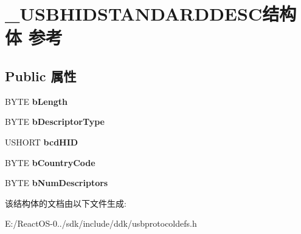 \hypertarget{struct___u_s_b_h_i_d_s_t_a_n_d_a_r_d_d_e_s_c}{}\section{\+\_\+\+U\+S\+B\+H\+I\+D\+S\+T\+A\+N\+D\+A\+R\+D\+D\+E\+S\+C结构体 参考}
\label{struct___u_s_b_h_i_d_s_t_a_n_d_a_r_d_d_e_s_c}
\subsection*{Public 属性}
\begin{DoxyCompactItemize}
\item 
\mbox{\label{struct___u_s_b_h_i_d_s_t_a_n_d_a_r_d_d_e_s_c_ad0d0dddd177ac843a0db0f98d6899f40}} 
B\+Y\+TE {\bfseries b\+Length}
\item 
\mbox{\label{struct___u_s_b_h_i_d_s_t_a_n_d_a_r_d_d_e_s_c_aa65ead3586c3c46619e8575e7a60b907}} 
B\+Y\+TE {\bfseries b\+Descriptor\+Type}
\item 
\mbox{\label{struct___u_s_b_h_i_d_s_t_a_n_d_a_r_d_d_e_s_c_ae37601306c31bb0b5603d6d6944233e5}} 
U\+S\+H\+O\+RT {\bfseries bcd\+H\+ID}
\item 
\mbox{\label{struct___u_s_b_h_i_d_s_t_a_n_d_a_r_d_d_e_s_c_a1cc5bcf533cdf6ed7f1e344644c549f3}} 
B\+Y\+TE {\bfseries b\+Country\+Code}
\item 
\mbox{\label{struct___u_s_b_h_i_d_s_t_a_n_d_a_r_d_d_e_s_c_a1707a9f62c069ae314674920a0d9ce62}} 
B\+Y\+TE {\bfseries b\+Num\+Descriptors}
\end{DoxyCompactItemize}


该结构体的文档由以下文件生成\+:\begin{DoxyCompactItemize}
\item 
E\+:/\+React\+O\+S-\/0../sdk/include/ddk/usbprotocoldefs.\+h\end{DoxyCompactItemize}
